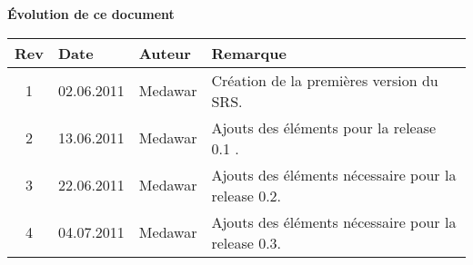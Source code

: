 \begin{large}
\textbf{Évolution de ce  document\\}
\end{large}
\begin{tabular}{|c|l|l|l|}
\hline  Rev &  Date &  Auteur & Remarque \\ 
\hline  1 &  02.06.2011 & Medawar  & Création de la premières version du SRS. \\ 
\hline  2 &  13.06.2011 & Medawar  & Ajouts des éléments pour la release 0.1  . \\ 
\hline  3 &  22.06.2011 & Medawar  & Ajouts des éléments nécessaire pour la release 0.2. \\ 
\hline  4 &  04.07.2011 & Medawar  & Ajouts des éléments nécessaire pour la release 0.3. \\ 

\hline 
\end{tabular} 